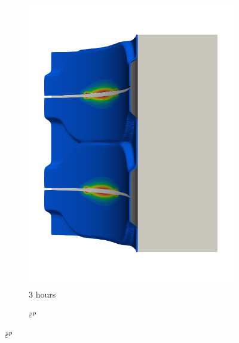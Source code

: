 \begin{figure}[!htb]
\begin{subfigure}[b]{0.2\textwidth}
    \includegraphics[width=\textwidth]{Chapter5/figures/spallation/seed_ep_7}
    \caption{3 hours}
  \end{subfigure}
  \begin{subfigure}[b]{0.1\textwidth}
    \centering
    \caption*{$\ep$}

\end{subfigure}
\end{figure}

